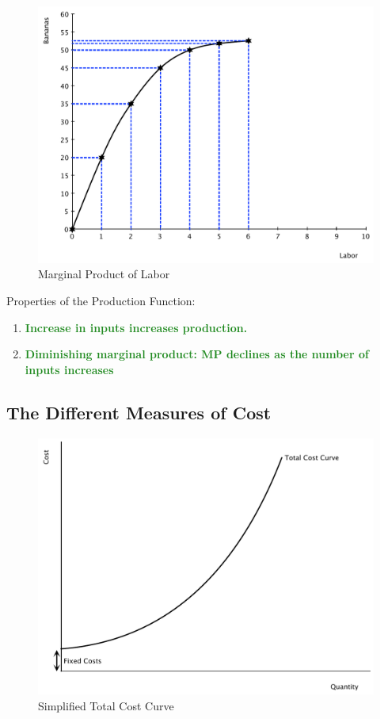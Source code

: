 \documentclass[11pt]{article}\usepackage[]{graphicx}\usepackage[]{color}
\theoremstyle{definition}
\newcommand{\ddp}[1]{{\textbf{\textcolor{ForestGreen}{#1}}}}
\begin{document}
	\begin{figure}[H]
		\centering
		\includegraphics[scale=.40]{plot55.pdf}
		\caption{Marginal Product of Labor}
	\end{figure}
	
	
	Properties of the Production Function:
	\begin{enumerate}
		\item \ddp{Increase in inputs increases production.}
		\item \ddp{Diminishing marginal product: MP declines as the number of inputs increases}
	\end{enumerate}
	
	\subsection{The Different Measures of Cost}
	
	\begin{figure}[H]
		\centering
		\includegraphics[scale=.35]{plot56.pdf}
		\caption{Simplified Total Cost Curve}
	\end{figure}
	
\end{document}
